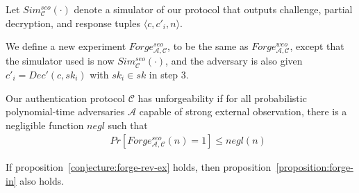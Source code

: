 \begin{definition} 
Let $Sim^{seo}_\mathcal{C}(\cdot)$ denote a simulator of our protocol that outputs challenge, partial decryption, and response tuples $\langle c, c'_{i}, n \rangle$.
\end{definition}

We define a new experiment $Forge^{seo}_{\mathcal{A}, \mathcal{C}}$, to be the same as $Forge^{weo}_{\mathcal{A}, \mathcal{C}}$, except that the simulator used is now $Sim^{seo}_\mathcal{C}(\cdot)$, and the adversary is also given $c'_i = Dec'(c, sk_{i})$ with $sk_i \in sk$ in step 3.

\begin{proposition}\label{proposition:forge-in}
Our authentication protocol $\mathcal{C}$ has unforgeability if for all probabilistic polynomial-time adversaries $\mathcal{A}$ capable of strong external observation, there is a negligible function $negl$ such that
{\setlength{\mathindent}{0cm}
\begin{align*}
&&    Pr\left[ Forge^{seo}_{\mathcal{A}, \mathcal{C}}(n)  = 1 \right] \leq negl(n) 
\end{align*}}
\end{proposition}

\begin{collary}
If proposition~\ref{conjecture:forge-rev-ex} holds, then proposition~\ref{proposition:forge-in} also holds.
\end{collary}

